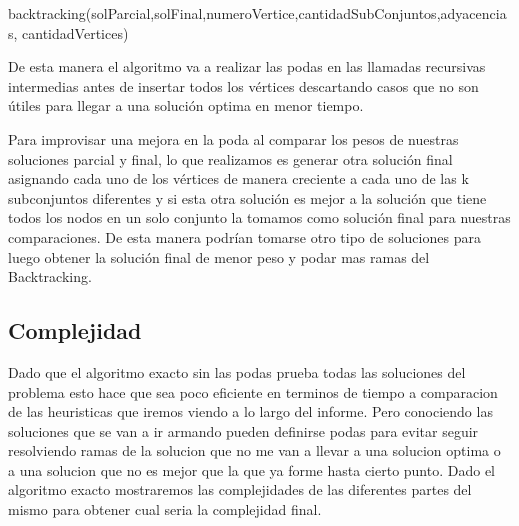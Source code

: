  \begin{algorithm}
 \begin{algorithmic}[1]\parskip=1mm
 \caption{backtracking(solParcial,solFinal,numeroVertice,cantidadSubConjuntos,adyacencias, cantidadVertices)}
  \end{algorithmic}
  \end{algorithm}

De esta manera el algoritmo va a realizar las podas en las llamadas recursivas intermedias antes de insertar todos los vértices descartando casos que no son útiles para llegar  a una solución optima en menor tiempo.

Para improvisar una mejora en la poda al comparar los pesos de nuestras soluciones parcial y final, lo que realizamos es generar otra solución final asignando cada uno de los vértices de manera creciente a cada uno de las k subconjuntos diferentes y si esta otra solución es mejor a la solución que tiene todos los nodos en un solo conjunto la tomamos como solución final para nuestras comparaciones.
De esta manera podrían tomarse otro tipo de soluciones para luego obtener la solución final de menor peso y podar mas ramas del Backtracking.	

\subsection{Complejidad}
Dado que el algoritmo exacto sin las podas prueba todas las soluciones del problema esto hace que sea poco eficiente en terminos de tiempo a comparacion de las heuristicas que iremos viendo a lo largo del informe. Pero conociendo las soluciones que se van a ir armando pueden definirse podas para evitar seguir resolviendo ramas de la solucion que no me van a llevar a una solucion optima o a una solucion que no es mejor que la que ya forme hasta cierto punto.
Dado el algoritmo exacto mostraremos las complejidades de las diferentes partes del mismo para obtener cual seria la complejidad final.

